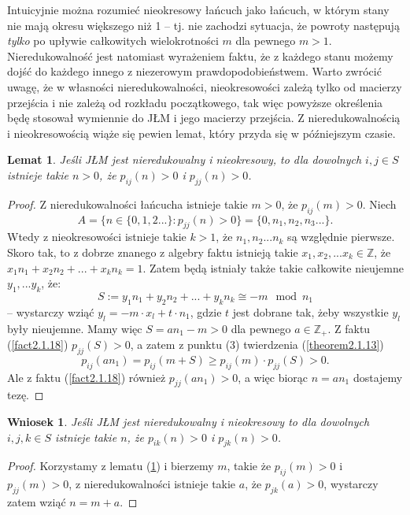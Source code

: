 \documentclass[a4paper]{article}
\theoremstyle{defn}
\theoremstyle{theorem}
\theoremstyle{lemma}
\newtheorem{lemma}[defn]{Lemat}
\theoremstyle{cor}
\newtheorem{cor}[defn]{Wniosek}
\theoremstyle{fact}
\begin{document}
Intuicyjnie można rozumieć nieokresowy łańcuch jako łańcuch, w którym stany nie mają okresu większego niż 1 – tj. nie zachodzi sytuacja, że powroty następują \textit{tylko} po upływie całkowitych wielokrotności $m$ dla pewnego $m>1$. Nieredukowalność jest natomiast wyrażeniem faktu, że z każdego stanu możemy dojść do każdego innego z niezerowym prawdopodobieństwem. Warto zwrócić uwagę, że w własności nieredukowalności, nieokresowości zależą tylko od macierzy przejścia i nie zależą od rozkładu początkowego, tak więc powyższe określenia będę stosował wymiennie do JŁM i jego macierzy przejścia. Z nieredukowalnością i nieokresowością wiąże się pewien lemat, który przyda się w późniejszym czasie.
\begin{lemma}\label{lemma2.1.19}
Jeśli JŁM jest nieredukowalny i nieokresowy, to dla dowolnych $i,j \in S$ istnieje takie $n > 0$, że $p_{ij}(n) > 0$ i $p_{jj}(n) > 0$.
\end{lemma}
\begin{proof}
Z nieredukowalności łańcucha istnieje takie $m > 0$, że $p_{ij}(m) > 0$.  Niech
$$A = \{n \in \{0, 1, 2...\}:  p_{jj}(n) > 0\} = \{0, n_1, n_2, n_3 ... \}.$$
Wtedy z nieokresowości istnieje takie $k > 1$, że $n_1, n_2... n_k$ są względnie pierwsze. Skoro tak, to z dobrze znanego z algebry faktu \cite{bezout} istnieją takie $x_1, x_2, ... x_k \in \mathbb{Z}$, że $x_1n_1 + x_2n_2 + ... + x_k n_k = 1$.  Zatem będą istniały także takie całkowite nieujemne $ y_1, ... y_k$, że:
$$S := y_1n_1 + y_2n_2 + ... + y_k n_k \cong -m \mod n_1$$
– wystarczy wziąć $y_l = -m \cdot x_l + t \cdot n_1$, gdzie $t$ jest dobrane tak, żeby wszystkie $y_l$ były nieujemne. Mamy więc $S = an_1 - m > 0$ dla pewnego $a \in \mathbb{Z}_+$. Z faktu (\ref{fact2.1.18}) $p_{jj}(S) > 0$, a zatem z punktu (3) twierdzenia (\ref{theorem2.1.13})  $$p_{ij}(an_1) = p_{ij}(m + S) \geq p_{ij}(m)\cdot p_{jj}(S) > 0.$$
Ale z faktu (\ref{fact2.1.18}) również $p_{jj}(an_1) > 0$, a więc biorąc $n = an_1$ dostajemy tezę.
\end{proof}

\begin{cor}\label{cor2.1.20}
Jeśli JŁM jest nieredukowalny i nieokresowy to dla dowolnych $i,j,k \in S$ istnieje takie $n$, że $p_{ik}(n) > 0$ i $p_{jk}(n) > 0$.
\end{cor}
\begin{proof}
Korzystamy z lematu (\ref{lemma2.1.19}) i bierzemy $m$, takie że $p_{ij}(m) > 0$ i $p_{jj}(m) > 0$, z nieredukowalności istnieje takie $a$, że $p_{jk}(a) > 0$, wystarczy zatem wziąć $n = m + a$.
\end{proof}
\end{document}
